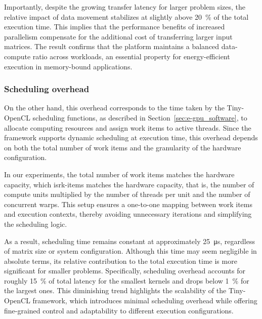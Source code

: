                 Importantly, despite the growing transfer latency for larger problem sizes, the relative impact of data movement stabilizes at slightly above \SI{20}{\percent} of the total execution time. This implies that the performance benefits of increased parallelism compensate for the additional cost of transferring larger input matrices. The result confirms that the platform maintains a balanced data-compute ratio across workloads, an essential property for energy-efficient execution in memory-bound applications.

            \vspace{-1em}
            \subsubsection*{Scheduling overhead}
            
                On the other hand, this overhead corresponds to the time taken by the \mbox{Tiny-OpenCL} scheduling functions, as described in Section~\ref{sec:e-gpu_software}, to allocate computing resources and assign work items to active threads. Since the framework supports dynamic scheduling at execution time, this overhead depends on both the total number of work items and the granularity of the hardware configuration.
        
                In our experiments, the total number of work items matches the hardware capacity, which isrk-items matches the hardware capacity, that is, the number of compute units multiplied by the number of threads per unit and the number of concurrent warps. This setup ensures a one-to-one mapping between work items and execution contexts, thereby avoiding unnecessary iterations and simplifying the scheduling logic.
        
                As a result, scheduling time remains constant at approximately \SI{25}{\micro\second}, regardless of matrix size or system configuration. Although this time may seem negligible in absolute terms, its relative contribution to the total execution time is more significant for smaller problems. Specifically, scheduling overhead accounts for roughly \SI{15}{\percent} of total latency for the smallest kernels and drops below \SI{1}{\percent} for the largest ones. This diminishing trend highlights the scalability of the \mbox{Tiny-OpenCL} framework, which introduces minimal scheduling overhead while offering fine-grained control and adaptability to different execution configurations.
                
